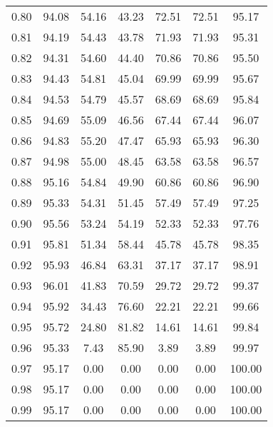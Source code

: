 \begin{tabular}{|c|c|c|c|c|c|c|}
      0.80 &     94.08 &     54.16 &      43.23 &   72.51 &      72.51 &         95.17 \\
      0.81 &     94.19 &     54.43 &      43.78 &   71.93 &      71.93 &         95.31 \\
      0.82 &     94.31 &     54.60 &      44.40 &   70.86 &      70.86 &         95.50 \\
      0.83 &     94.43 &     54.81 &      45.04 &   69.99 &      69.99 &         95.67 \\
      0.84 &     94.53 &     54.79 &      45.57 &   68.69 &      68.69 &         95.84 \\
      0.85 &     94.69 &     55.09 &      46.56 &   67.44 &      67.44 &         96.07 \\
      0.86 &     94.83 &     55.20 &      47.47 &   65.93 &      65.93 &         96.30 \\
      0.87 &     94.98 &     55.00 &      48.45 &   63.58 &      63.58 &         96.57 \\
      0.88 &     95.16 &     54.84 &      49.90 &   60.86 &      60.86 &         96.90 \\
      0.89 &     95.33 &     54.31 &      51.45 &   57.49 &      57.49 &         97.25 \\
      0.90 &     95.56 &     53.24 &      54.19 &   52.33 &      52.33 &         97.76 \\
      0.91 &     95.81 &     51.34 &      58.44 &   45.78 &      45.78 &         98.35 \\
      0.92 &     95.93 &     46.84 &      63.31 &   37.17 &      37.17 &         98.91 \\
      0.93 &     96.01 &     41.83 &      70.59 &   29.72 &      29.72 &         99.37 \\
      0.94 &     95.92 &     34.43 &      76.60 &   22.21 &      22.21 &         99.66 \\
      0.95 &     95.72 &     24.80 &      81.82 &   14.61 &      14.61 &         99.84 \\
      0.96 &     95.33 &      7.43 &      85.90 &    3.89 &       3.89 &         99.97 \\
      0.97 &     95.17 &      0.00 &       0.00 &    0.00 &       0.00 &        100.00 \\
      0.98 &     95.17 &      0.00 &       0.00 &    0.00 &       0.00 &        100.00 \\
      0.99 &     95.17 &      0.00 &       0.00 &    0.00 &       0.00 &        100.00 \\
\bottomrule
\end{tabular}

